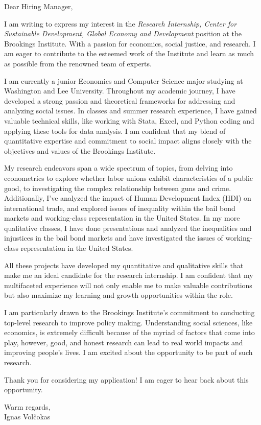 \documentclass[letterpaper,11pt]{article}
\newcommand{\n}
    {
    \vskip 1cm
    }
\newcommand{\p}
{
\vskip 0.5cm
}
\begin{document}
\p
\n
Dear Hiring Manager,
\n
I am writing to express my interest in the {\it{Research Internship, Center for Sustainable Development, Global Economy and Development}} position at the Brookings Institute. With a passion for economics, social justice, and research. I am eager to contribute to the esteemed work of the Institute and learn as much as possible from the renowned team of experts.
\p
I am currently a junior Economics and Computer Science major studying at Washington and Lee University. Throughout my academic journey, I have developed a strong passion and theoretical frameworks for addressing and analyzing social issues. In classes and summer research experience, I have gained valuable technical skills, like working with Stata, Excel, and Python coding and applying these tools for data analysis.  I am confident that my blend of quantitative expertise and commitment to social impact aligns closely with the objectives and values of the Brookings Institute.
\p
My research endeavors span a wide spectrum of topics, from delving into econometrics to explore whether labor unions exhibit characteristics of a public good, to investigating the complex relationship between guns and crime. Additionally, I've analyzed the impact of Human Development Index (HDI) on international trade, and explored issues of inequality within the bail bond markets and working-class representation in the United States.
In my more qualitative classes, I have done presentations and analyzed the inequalities and injustices in the bail bond markets and have investigated the issues of working-class representation in the United States. 
\p
All these projects have developed my quantitative and qualitative skills that make me an ideal candidate for the research internship. I am confident that my multifaceted experience will not only enable me to make valuable contributions but also maximize my learning and growth opportunities within the role.
\p
I am particularly drawn to the Brookings Institute's commitment to conducting top-level research to improve policy making. Understanding social sciences, like economics, is extremely difficult because of the myriad of factors that come into play, however, good, and honest research can lead to real world impacts and improving people’s lives. I am excited about the opportunity to be part of such research. 
\p
Thank you for considering my application!  I am eager to hear back about this opportunity.
\n
Warm regards,\\
Ignas Volčokas
\end{document}
